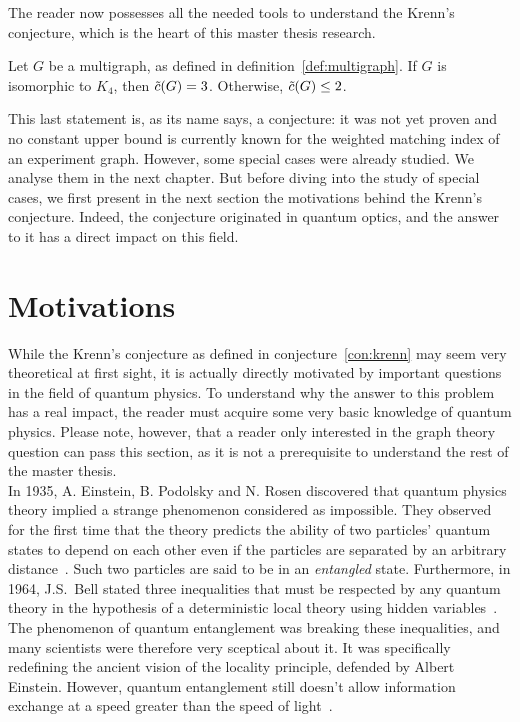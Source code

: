 The reader now possesses all the needed tools to understand the Krenn's conjecture, which is the heart of this master thesis research.

\begin{conjecture}
    \label{con:krenn}
    Let $G$ be a multigraph, as defined in definition~\ref{def:multigraph}.
    If $G$ is isomorphic to $K_4$, then $\Tilde{c}(G) = 3$.
    Otherwise, $\Tilde{c}(G) \leq 2$.
\end{conjecture}

This last statement is, as its name says, a conjecture: it was not yet proven and no constant upper bound is currently known for the weighted matching index of an experiment graph.
However, some special cases were already studied.
We analyse them in the next chapter.
But before diving into the study of special cases, we first present in the next section the motivations behind the Krenn's conjecture.
Indeed, the conjecture originated in quantum optics, and the answer to it has a direct impact on this field.


\section{Motivations}
\label{sec:motivations}

While the Krenn's conjecture as defined in conjecture~\ref{con:krenn} may seem very theoretical at first sight, it is actually directly motivated by important questions in the field of quantum physics.
To understand why the answer to this problem has a real impact, the reader must acquire some very basic knowledge of quantum physics.
Please note, however, that a reader only interested in the graph theory question can pass this section, as it is not a prerequisite to understand the rest of the master thesis. \\

In 1935, A. Einstein, B. Podolsky and N. Rosen discovered that quantum physics theory implied a strange phenomenon considered as impossible.
They observed for the first time that the theory predicts the ability of two particles' quantum states to depend on each other even if the particles are separated by an arbitrary distance~\cite{EPR}.
Such two particles are said to be in an \textit{entangled} state.
Furthermore, in 1964, J.S.\ Bell stated three inequalities that must be respected by any quantum theory in the hypothesis of a deterministic local theory using hidden variables~\cite{bell1964}.
The phenomenon of quantum entanglement was breaking these inequalities, and many scientists were therefore very sceptical about it.
It was specifically redefining the ancient vision of the locality principle, defended by Albert Einstein.
However, quantum entanglement still doesn't allow information exchange at a speed greater than the speed of light~\cite{notFasterThanLight}.\\

